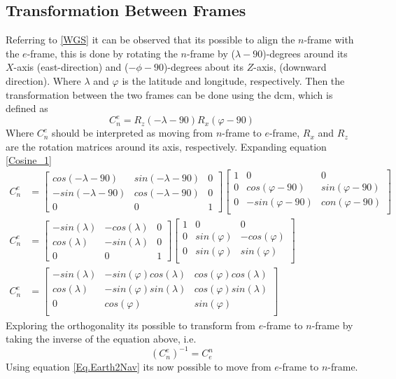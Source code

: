 \subsection{Transformation Between Frames}
Referring to \autoref{WGS} it can be observed that its possible to align the $n$-frame with the $e$-frame, this is done by rotating the $n$-frame by ($\lambda-90$)-degrees around its $X$-axis (east-direction) and ($-\phi-90$)-degrees about its $Z$-axis, (downward direction)\cite{nonlinear}. Where $\lambda$ and $\varphi$ is the latitude and longitude, respectively. Then the transformation between the two frames can be done using the \gls{dcm}\cite{nonlinear}, which is defined as
\begin{equation}
C_n^e=R_z(-\lambda-90)R_x(\varphi-90)
\label{Cosine_1}
\end{equation}
Where $C_n^e$ should be interpreted as moving from $n$-frame to $e$-frame, $R_x$ and $R_z$ are the rotation matrices around its axis, respectively. Expanding equation \eqref{Cosine_1}
\begin{align}
C_n^e &=
\begin{bmatrix}
cos(-\lambda-90) & sin(-\lambda-90) & 0\\
-sin(-\lambda-90) & cos(-\lambda-90) & 0\\
0 & 0 & 1
\end{bmatrix}
\begin{bmatrix}
1 & 0 & 0\\
0 & cos(\varphi-90) & sin(\varphi-90) \\
0 & -sin(\varphi-90) & con(\varphi-90) \\
\end{bmatrix}\\
C_n^e &=
\begin{bmatrix}
-sin(\lambda) & -cos(\lambda) & 0\\
cos(\lambda) & -sin(\lambda) & 0\\
0 & 0 & 1
\end{bmatrix}
\begin{bmatrix}
1 & 0 & 0\\
0 & sin(\varphi) & -cos(\varphi) \\
0 & sin(\varphi) & sin(\varphi) \\
\end{bmatrix}\\
C_n^e &=
\begin{bmatrix}
-sin(\lambda) & -sin(\varphi)cos(\lambda) & cos(\varphi)cos(\lambda) \\
cos(\lambda) & -sin(\varphi)sin(\lambda) &  cos(\varphi)sin(\lambda) \\
0 & cos(\varphi) & sin(\varphi) \\
\end{bmatrix}
\end{align}
Exploring the orthogonality its possible to transform from $e$-frame to $n$-frame by taking the inverse of the equation above, i.e.
\begin{equation}
(C_n^e)^{-1}=C_e^n
\label{Eq.Earth2Nav}
\end{equation}
Using equation \eqref{Eq.Earth2Nav} its now possible to move from $e$-frame to $n$-frame.

